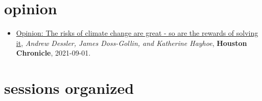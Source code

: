 \documentclass[10pt,oneside]{article}
\begin{document}
\section{opinion}

\mbox{}\vspace{-\dimexpr\baselineskip\relax}

\begin{itemize}[label={}]
  
  \item \href{https://www.houstonchronicle.com/opinion/outlook/article/Opinion-The-risks-of-climate-change-are-great-16426616.php}{Opinion: The risks of climate change are great - so are the rewards of solving it}, \textit{Andrew Dessler, James Doss-Gollin, and Katherine Hayhoe}, \textbf{Houston Chronicle}, 2021-09-01.
        
\end{itemize}


\section{sessions organized}

\mbox{}\vspace{-\dimexpr\baselineskip\relax}
\end{document}
